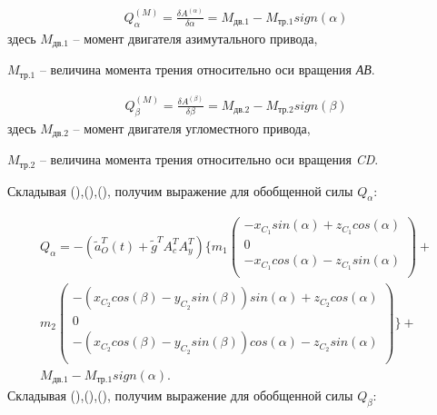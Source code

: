 \begin{equation} %
\label{eq:p3:38}
\begin{multlined}
Q_{ \alpha }^{ \left( M \right) }=\frac{ \delta A^{ \left( \alpha \right) }}{ \delta \alpha }=M_{\textit{дв.1}}-M_{\textit{тр.1}}sign \left( \alpha \right) 
\end{multlined}
\end{equation}
здесь \( M_{\textit{дв.1}} \) – момент двигателя азимутального привода, 

\( M_{\textit{тр.1}} \) – величина момента трения относительно оси вращения \textit{АВ}. 


\begin{equation} %
\label{eq:p3:39}
\begin{multlined}
Q_{ \beta }^{ \left( M \right) }=\frac{ \delta A^{ \left( \beta \right) }}{ \delta \beta }=M_{\textit{дв.2}}-M_{\textit{тр.2}}sign \left( \beta \right) 
\end{multlined}
\end{equation}
здесь \( M_{\textit{дв.2}} \) – момент двигателя угломестного привода, 

\( M_{\textit{тр.2}} \) – величина момента трения относительно оси вращения \textit{CD}. 

Складывая (),(),(), получим выражение для обобщенной силы \( Q_{ \alpha } \): 


\begin{equation} %
\label{eq:p3:40}
\begin{multlined}
Q_{ \alpha }=- \left( \tilde{a}_{O}^{T} \left( t \right) +\tilde{g}^{T}A_{c}^{T}A_{y}^{T} \right) 
\{ 
	m_{1} \left( 
	\begin{array}{c}
		-x_{C_{1}}sin \left( \alpha \right) +z_{C_{1}}cos \left( \alpha \right)\\
		0\\
		-x_{C_{1}}cos \left( \alpha \right) -z_{C_{1}}sin \left( \alpha \right) \\
	\end{array}
	\right) + \\
	m_{2} \left( 
	\begin{array}{c}
		- \left( x_{C_{2}}cos \left( \beta \right) -y_{C_{2}}sin \left( \beta \right) \right) sin \left( \alpha \right) +z_{C_{2}}cos \left( \alpha \right)\\
		0\\
		- \left( x_{C_{2}}cos \left( \beta \right) -y_{C_{2}}sin \left( \beta \right) \right) cos \left( \alpha \right) -z_{C_{2}}sin \left( \alpha \right)\\
	\end{array}
	\right) 
\} 
+ \\
M_{\textit{дв.1}}-
M_{\textit{тр.1}}sign \left( \alpha \right) .
\end{multlined}
\end{equation}
Складывая (),(),(), получим выражение для обобщенной силы \( Q_{ \beta } \): 


